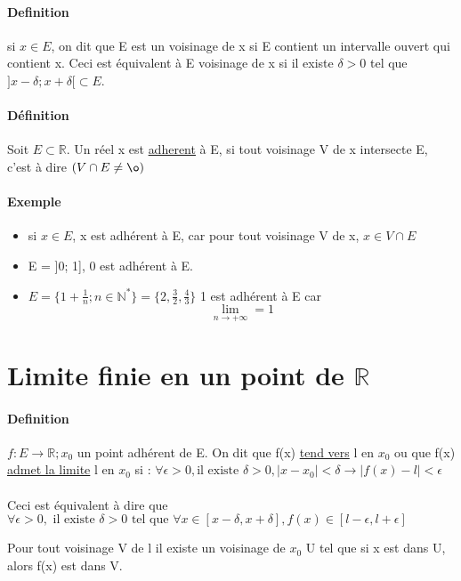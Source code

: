 \paragraph{Definition} si $x \in E$, on dit que E est un voisinage de x si E contient un intervalle ouvert qui contient x. Ceci est équivalent à E voisinage de x si il existe $\delta > 0$  tel que $]x - \delta; x + \delta[ \subset E$.

\paragraph{Définition} Soit $E \subset \mathbb{R}$. Un réel x est \ul{adherent} à E, si tout voisinage V de x intersecte E, c'est à dire $(V \cap E \neq \o)$

\paragraph{Exemple} 
\begin{itemize}
	\item si $x \in E$, x est adhérent à E, car pour tout voisinage V de x, $x \in V \cap E$
	\item E = ]0; 1], 0 est adhérent à E.
	\item $E = \{1 + \frac{1}{n}; n \in \mathbb{N}^*\} = \{2, \frac{3}{2}, \frac{4}{3}\}$
		1 est adhérent à E car \[\lim_{n \to +\infty} = 1\]
\end{itemize}

\section{Limite finie en un point de $\mathbb{R}$}

\paragraph{Definition} $f : E \rightarrow \mathbb{R}; x_0$ un point adhérent de E.
On dit que f(x) \ul{tend vers} l en $x_0$ ou que f(x) \ul{admet la limite} l en $x_0$ si :
$\forall \epsilon > 0, \text{il existe } \delta > 0, |x - x_0| < \delta \rightarrow |f(x) - l| < \epsilon$
~\\
~\\ 
Ceci est équivalent à dire que $\forall \epsilon > 0, \text{ il existe } \delta > 0 \text{ tel que } \forall x \in [x-\delta, x+\delta], f(x) \in [l-\epsilon, l+\epsilon]$

Pour tout voisinage V de l il existe un voisinage de $x_0$ U tel que si x est dans U, alors f(x) est dans V.
